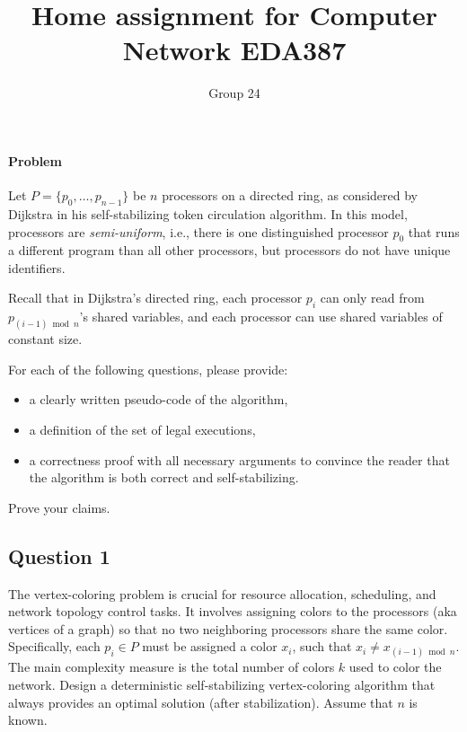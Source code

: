 \documentclass[12pt]{article}
\title{Home assignment for Computer Network EDA387}
\author{Group 24}
\begin{document}
\maketitle

\vspace{0.5in}

\paragraph{Problem}

Let $P = \{p_0, \ldots, p_{n-1}\}$ be $n$ processors on a directed ring, 
as considered by Dijkstra in his self-stabilizing token circulation algorithm. 
In this model, processors are \emph{semi-uniform}, i.e., there is one distinguished 
processor $p_0$ that runs a different program than all other processors, 
but processors do not have unique identifiers. 

Recall that in Dijkstra’s directed ring, each processor $p_i$ can only read from 
$p_{(i-1)\bmod n}$'s shared variables, and each processor can use shared variables 
of constant size. 

For each of the following questions, please provide:
\begin{itemize}
  \item a clearly written pseudo-code of the algorithm, 
  \item a definition of the set of legal executions, 
  \item a correctness proof with all necessary arguments to convince the reader 
        that the algorithm is both correct and self-stabilizing. 
\end{itemize}

Prove your claims.

\subsection*{Question 1}


The vertex-coloring problem is crucial for resource allocation, scheduling,
and network topology control tasks. It involves assigning colors to the 
processors (aka vertices of a graph) so that no two neighboring processors 
share the same color. Specifically, each $p_i \in P$ must be assigned a 
color $x_i$, such that $x_i \neq x_{(i-1) \bmod n}$. The main complexity 
measure is the total number of colors $k$ used to color the network. 
Design a deterministic self-stabilizing vertex-coloring algorithm that 
always provides an optimal solution (after stabilization). Assume that $n$ 
is known.
\end{document}
